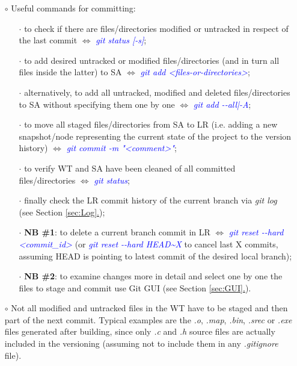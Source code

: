 \documentclass[a4paper,portrait,10pt]{article}   %
\newcommand{\mybulletlvA}{$\circ$}   %
\newcommand{\mybulletlvB}{$\cdot$}   %
\newcommand{\mydiv}{$\Leftrightarrow$ }   %
\newcommand{\mycmd}[1]{\textcolor{blue}{\textit{#1}}}   %
\newcommand{\myvspace}{\vspace{4mm}}   %
\newcommand{\mysecref}[1]{\hyperref[#1]{\ref{#1}.}}   %
\begin{document}
\begin{itemize}
\item[\mybulletlvA] Useful commands for committing:
\begin{itemize}
  \item[\mybulletlvB] to check if there are files/directories modified or untracked in respect of the last commit \mydiv \mycmd{git status [-s]};
  \item[\mybulletlvB] to add desired untracked or modified files/directories (and in turn all files inside the latter) to SA \mydiv \mycmd{git add <files-or-directories>};
  \item[\mybulletlvB] alternatively, to add all untracked, modified and deleted files/directories to SA without specifying them one by one \mydiv \mycmd{git add -{}-all|-A};
  \item[\mybulletlvB] to move all staged files/directories from SA to LR (i.e. adding a new snapshot/node representing the current state of the project to the version history) \mydiv \mycmd{git commit -m "<comment>"};
  \item[\mybulletlvB] to verify WT and SA have been cleaned of all committed files/directories \mydiv \mycmd{git status};
  \item[\mybulletlvB] finally check the LR commit history of the current branch via \textit{git log} (see Section \mysecref{sec:Log});
  \item[\mybulletlvB] \textbf{NB \#1}: to delete a current branch commit in LR \mydiv \mycmd{git reset -{}-hard <commit\_id>} (or \mycmd{git reset -{}-hard HEAD\textasciitilde X} to cancel last X commits, assuming HEAD is pointing to latest commit of the desired local branch);
  \item[\mybulletlvB] \textbf{NB \#2}: to examine changes more in detail and select one by one the files to stage and commit use Git GUI (see Section \mysecref{sec:GUI}).
\end{itemize}
\myvspace

\item[\mybulletlvA] Not all modified and untracked files in the WT have to be staged and then part of the next commit. Typical examples are the \textit{.o}, \textit{.map}, \textit{.bin}, \textit{.srec} or \textit{.exe} files generated after building, since only \textit{.c} and \textit{.h} source files are actually included in the versioning (assuming not to include them in any \textit{.gitignore} file).
\end{itemize}
\myvspace

\end{document}
